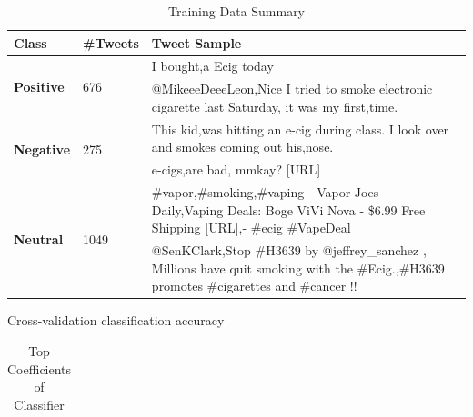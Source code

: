 \documentclass{sig-alternate}
\begin{document}
\begin{table}[t]
\centering
\caption{Training Data Summary}
\label{tab:labelsample}
\begin{tabular}{|l|l|p{9cm}|}
\hline
{\bf Class}                     & {\bf \#Tweets}        & {\bf Tweet Sample}                                                                                                                       \\ \hline
\multirow{2}{*}{{\bf Positive}} & \multirow{2}{*}{676}  & I bought,a Ecig today                                                                                                                    \\ \cline{3-3} 
                                &                       & @MikeeeDeeeLeon,Nice I tried to smoke electronic cigarette last Saturday, it was my first,time.                                          \\ \hline
\multirow{2}{*}{{\bf Negative}} & \multirow{2}{*}{275}  & This kid,was hitting an e-cig during class. I look over and smokes coming out his,nose.                                                  \\ \cline{3-3} 
                                &                       & e-cigs,are bad, mmkay? {[}URL{]}                                                                                                         \\ \hline
\multirow{2}{*}{{\bf Neutral}}  & \multirow{2}{*}{1049} & \#vapor,\#smoking,\#vaping - Vapor Joes - Daily,Vaping Deals: Boge ViVi Nova - \$6.99 Free Shipping {[}URL{]},- \#ecig \#VapeDeal        \\ \cline{3-3} 
                                &                       & @SenKClark,Stop \#H3639 by @jeffrey\_sanchez , Millions have quit smoking with the \#Ecig.,\#H3639 promotes \#cigarettes and \#cancer !! \\ \hline
\end{tabular}
\end{table}

\begin{table}[t]
\caption{Cross-validation classification accuracy \label{tab:measure}}
\centering

\end{table}

\begin{table}[t]
\centering
\caption{Top Coefficients of Classifier}
\label{tab:coef}
\begin{tabular}{|r|p{14cm}| }
\hline

\end{tabular}
\end{table}
\end{document}
